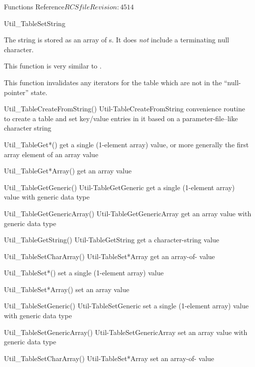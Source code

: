 \begin{cactuspart}{ Functions Reference}{$RCSfile$}{$Revision: 4514 $}
\begin{FunctionDescription}{Util\_TableSetString}
\begin{Discussion}
The string is stored as an array of 
s.  It does {\em not\/} include a terminating
null character.

This function is very similar to .

This function invalidates any iterators for the table which are
not in the ``null-pointer'' state.
\end{Discussion}

\begin{SeeAlsoSection}
\begin{SeeAlso2} {Util\_TableCreateFromString()} {Util-TableCreateFromString}
convenience routine to create a table and set key/value entries
in it based on a parameter-file--like character string
\end{SeeAlso2}
\begin{SeeAlso}{Util\_TableGet*()}
get a single (1-element array) value,
or more generally the first array element of an array value
\end{SeeAlso}
\begin{SeeAlso}{Util\_TableGet*Array()}
get an array value
\end{SeeAlso}
\begin{SeeAlso2} {Util\_TableGetGeneric()} {Util-TableGetGeneric}
get a single (1-element array) value with generic data type
\end{SeeAlso2}
\begin{SeeAlso2} {Util\_TableGetGenericArray()} {Util-TableGetGenericArray}
get an array value with generic data type
\end{SeeAlso2}
\begin{SeeAlso2} {Util\_TableGetString()} {Util-TableGetString}
get a character-string value
\end{SeeAlso2}
\begin{SeeAlso2} {Util\_TableSetCharArray()} {Util-TableSet*Array}
get an array-of- value
\end{SeeAlso2}
\begin{SeeAlso}{Util\_TableSet*()}
set a single (1-element array) value
\end{SeeAlso}
\begin{SeeAlso}{Util\_TableSet*Array()}
set an array value
\end{SeeAlso}
\begin{SeeAlso2} {Util\_TableSetGeneric()} {Util-TableSetGeneric}
set a single (1-element array) value with generic data type
\end{SeeAlso2}
\begin{SeeAlso2} {Util\_TableSetGenericArray()} {Util-TableSetGenericArray}
set an array value with generic data type
\end{SeeAlso2}
\begin{SeeAlso2} {Util\_TableSetCharArray()} {Util-TableSet*Array}
set an array-of- value
\end{SeeAlso2}
\end{SeeAlsoSection}


\end{FunctionDescription}
\end{cactuspart}
